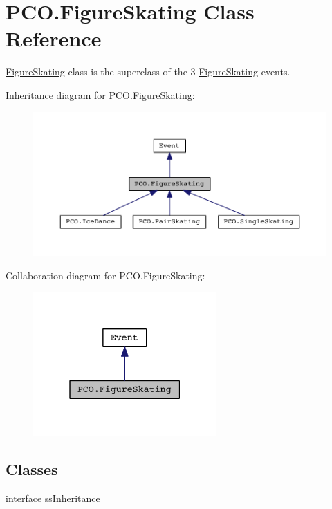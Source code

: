 \hypertarget{classPCO_1_1FigureSkating}{\section{P\+C\+O.\+Figure\+Skating Class Reference}
\label{classPCO_1_1FigureSkating}
}


\hyperlink{classPCO_1_1FigureSkating}{Figure\+Skating} class is the superclass of the 3 \hyperlink{classPCO_1_1FigureSkating}{Figure\+Skating} events.  




Inheritance diagram for P\+C\+O.\+Figure\+Skating\+:\nopagebreak
\begin{figure}[H]
\begin{center}
\leavevmode
\includegraphics[width=350pt]{classPCO_1_1FigureSkating__inherit__graph}
\end{center}
\end{figure}


Collaboration diagram for P\+C\+O.\+Figure\+Skating\+:\nopagebreak
\begin{figure}[H]
\begin{center}
\leavevmode
\includegraphics[width=199pt]{classPCO_1_1FigureSkating__coll__graph}
\end{center}
\end{figure}
\subsection*{Classes}
\begin{DoxyCompactItemize}
\item 
interface \hyperlink{interfacePCO_1_1FigureSkating_1_1ssInheritance}{ss\+Inheritance}
\end{DoxyCompactItemize}
